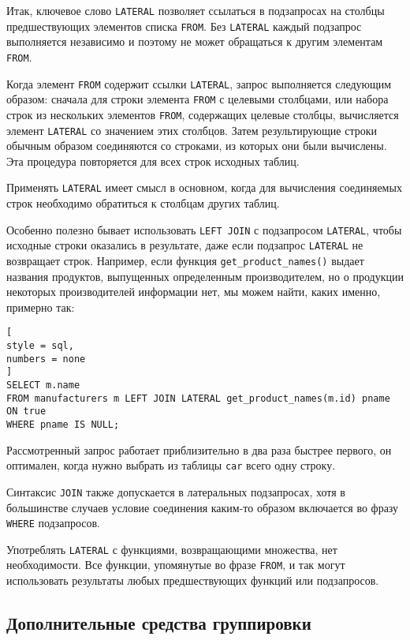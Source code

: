 \documentclass[%
	11pt,
	a4paper,
	utf8,
		]{article}
\begin{document}
Итак, ключевое слово \texttt{LATERAL} позволяет ссылаться в подзапросах на столбцы предшествующих элементов списка \texttt{FROM}. Без \texttt{LATERAL} каждый подзапрос выполняется независимо и поэтому не может обращаться к другим элементам \texttt{FROM}.


Когда элемент \texttt{FROM} содержит ссылки \texttt{LATERAL}, запрос выполняется следующим образом: сначала для строки элемента \texttt{FROM} с целевыми столбцами, или набора строк из нескольких элементов \texttt{FROM}, содержащих целевые столбцы, вычисляется элемент \texttt{LATERAL} со значением этих столбцов. Затем результирующие строки обычным образом соединяются со строками, из которых они были вычислены. Эта процедура повторяется для всех строк исходных таблиц.

Применять \texttt{LATERAL} имеет смысл в основном, когда для вычисления соединяемых строк необходимо обратиться к столбцам других таблиц. 

Особенно полезно бывает использовать \texttt{LEFT JOIN} с подзапросом \texttt{LATERAL}, чтобы исходные строки оказались в результате, даже если подзапрос \texttt{LATERAL} не возвращает строк. Например, если функция \texttt{get\_product\_names()} выдает названия продуктов, выпущенных определенным производителем, но о продукции некоторых производителей информации нет, мы можем найти, каких именно, примерно так:
\begin{lstlisting}[
style = sql,
numbers = none
]
SELECT m.name
FROM manufacturers m LEFT JOIN LATERAL get_product_names(m.id) pname ON true
WHERE pname IS NULL;
\end{lstlisting}

Рассмотренный запрос работает приблизительно в два раза быстрее первого, он оптимален, когда нужно выбрать из таблицы \texttt{car} всего одну строку.

Синтаксис \texttt{JOIN} также допускается в латеральных подзапросах, хотя в большинстве случаев условие соединения каким-то образом включается во фразу \texttt{WHERE} подзапросов.

Употреблять \texttt{LATERAL} с функциями, возвращающими множества, нет необходимости. Все функции, упомянутые во фразе \texttt{FROM}, и так могут использовать результаты любых предшествующих функций или подзапросов.

\subsection{Дополнительные средства группировки}
\end{document}
